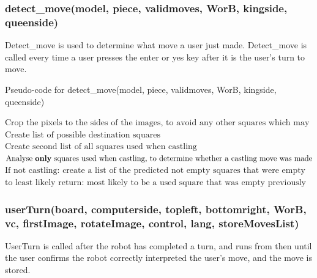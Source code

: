 \documentclass[onecolumn]{IEEEtran}
\begin{document}
\subsubsection{detect\_move(model, piece, validmoves, WorB, kingside, queenside)}
Detect\_move is used to determine what move a user just made. Detect\_move is called every time a user presses the enter or yes key after it is the user's turn to move. 

\begin{algorithm}[H]
\caption{Pseudo-code for detect\_move(model, piece, validmoves, WorB, kingside, queenside)}
\begin{algorithmic}[1]
\STATE $\text{Crop the pixels to the sides of the images, to avoid any other squares which may be visible within the image}$
\STATE $\text{Create list of possible destination squares}$
\STATE $\text{Create second list of all squares used when castling}$
\STATE $\text{Analyse \textbf{only} squares used when castling, to determine whether a castling move was made}$
\STATE $\text{If not castling: create a list of the predicted not empty squares that were empty previously, in order of most}$
\STATEx $\text{to least likely}$
\STATE $\text{return: most likely to be a used square that was empty previously}$
\end{algorithmic}
\end{algorithm}


\subsubsection{userTurn(board, computerside, topleft, bottomright, WorB, vc, firstImage, rotateImage, control, lang, storeMovesList)}
UserTurn is called after the robot has completed a turn, and runs from then until the user confirms the robot correctly interpreted the user's move, and the move is stored. 
\end{document}
